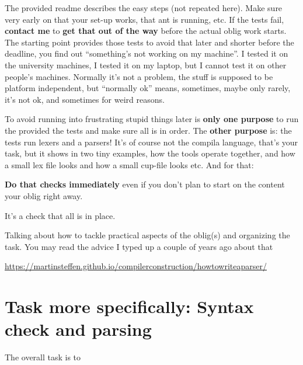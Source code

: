 \documentclass[10pt,freeform]{handout}[2014/08/13]
\begin{document}
The provided readme describes the easy steps (not repeated here). Make sure
very early on that your set-up works, that ant is running, etc. If the
tests fail, \textbf{contact me} to \textbf{get that out of the way} before
the actual oblig work starts. The starting point provides those tests to
avoid that later and shorter before the deadline, you find out
``something's not working on my machine''. I tested it on the university
machines, I tested it on my laptop, but I cannot test it on other people's
machines.  Normally it's not a problem, the stuff is supposed to be
platform independent, but ``normally ok'' means, sometimes, maybe only
rarely, it's not ok, and sometimes for weird reasons.

To avoid running into frustrating stupid things later is \textbf{only one
  purpose} to run the provided the tests and make sure all is in order. The
\textbf{other purpose} is: the tests run lexers and a parsers!  It's of
course not the compila language, that's your task, but it shows in two tiny
examples, how the tools operate together, and how a small lex file looks
and how a small cup-file looks etc. And for that:

\begin{center}
  \textbf{Do that checks immediately} even if you don't plan to start on
  the content your oblig right away.
\end{center}
It's a check that all is in place.

Talking about how to tackle practical aspects of the oblig(s) and
organizing the task. You may read the advice I typed up a couple of years
ago about that

\begin{center}
  \url{https://martinsteffen.github.io/compilerconstruction/howtowriteaparser/}
\end{center}





\section{Task more specifically: Syntax check and parsing}
\label{sec:task-more-spec}


The overall task is to 
\end{document}
